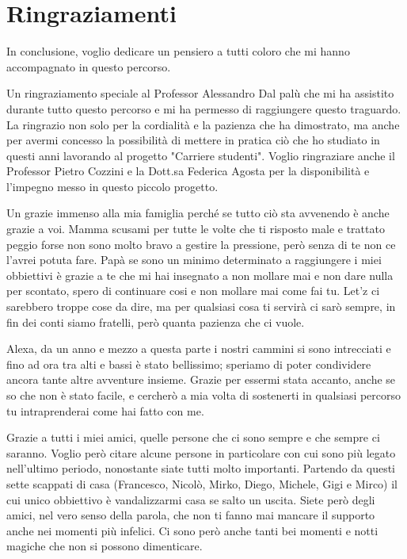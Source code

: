 \chapter*{Ringraziamenti}
In conclusione, voglio dedicare un pensiero a tutti coloro che mi hanno accompagnato in questo percorso.

Un ringraziamento speciale al Professor Alessandro Dal palù che mi ha assistito durante tutto questo percorso e mi ha permesso di raggiungere questo traguardo. La ringrazio non solo per la cordialità e la pazienza che ha dimostrato, ma anche per avermi concesso la possibilità di mettere in pratica ciò che ho studiato in questi anni lavorando al progetto "Carriere studenti". Voglio ringraziare anche il Professor Pietro Cozzini e la Dott.sa Federica Agosta per la disponibilità e l'impegno messo in questo piccolo progetto.

Un grazie immenso alla mia famiglia perché se tutto ciò sta avvenendo è anche grazie a voi. Mamma scusami per tutte le volte che ti risposto male e trattato peggio forse non sono molto bravo a gestire la pressione, però senza di te non ce l'avrei potuta fare. Papà se sono un minimo determinato a raggiungere i miei obbiettivi è grazie a te che mi hai insegnato a non mollare mai e non dare nulla per scontato, spero di continuare cosi e non mollare mai come fai tu. Let'z ci sarebbero troppe cose da dire, ma per qualsiasi cosa ti servirà ci sarò sempre, in fin dei conti siamo fratelli, però quanta pazienza che ci vuole. 

Alexa, da un anno e mezzo a questa parte i nostri cammini si sono intrecciati e fino ad ora tra alti e bassi è stato bellissimo; speriamo di poter condividere ancora tante altre avventure insieme. Grazie per essermi stata accanto, anche se so che non è stato facile, e cercherò a mia volta di sostenerti in qualsiasi percorso tu intraprenderai come hai fatto con me.

Grazie a tutti i miei amici, quelle persone che ci sono sempre e che sempre ci saranno. Voglio però citare alcune persone in particolare con cui sono più legato nell'ultimo periodo, nonostante siate tutti molto importanti. Partendo da questi sette scappati di casa (Francesco, Nicolò, Mirko, Diego, Michele, Gigi e Mirco) il cui unico obbiettivo è vandalizzarmi casa se salto un uscita. Siete però degli amici, nel vero senso della parola, che non ti fanno mai mancare il supporto anche nei momenti più infelici. Ci sono però anche tanti bei momenti e notti magiche che non si possono dimenticare. 

